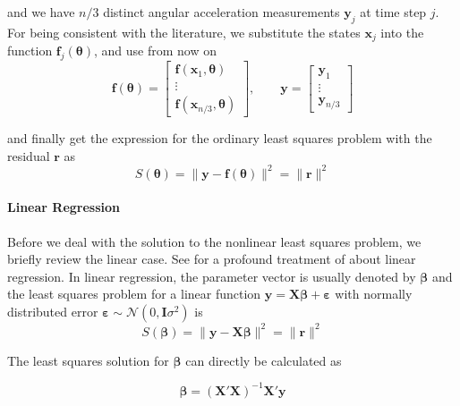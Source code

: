 and we have $n/3$ distinct angular acceleration measurements $\mathbf{y}_j$ at time step $j$.
For being consistent with the literature, we substitute the states $\mathbf{x}_j$ into the function $\mathbf{f}_j(\boldsymbol{\theta})$, and use from now on
\begin{equation}
\mathbf{f}(\boldsymbol{\theta}) = \left[ \begin{array}{c}
\mathbf{f}(\mathbf{x}_1, \boldsymbol{\theta}) \\
\vdots \\
\mathbf{f}(\mathbf{x}_{n/3}, \boldsymbol{\theta})
\end{array} \right]
, \qquad
\mathbf{y} = \left[ \begin{array}{c}
\mathbf{y}_1 \\
\vdots \\
\mathbf{y}_{n/3} 
\end{array} \right]
\end{equation}

and finally get the expression for the ordinary least squares problem with the residual $\mathbf{r}$ as
\begin{equation}
\label{eq:cost_ols}
S(\boldsymbol{\theta}) = \| \mathbf{y} - \mathbf{f}(\boldsymbol{\theta}) \|^2 = \| \mathbf{r} \|^2
\end{equation}

\paragraph{Linear Regression\\}
Before we deal with the solution to the nonlinear least squares problem, we briefly review the linear case. See \citet{Draper} for a profound treatment of about linear regression.
In linear regression, the parameter vector is usually denoted by $\boldsymbol{\beta}$ and the least squares problem for a linear function 
$\mathbf{y} = \mathbf{X} \boldsymbol{\beta} + \boldsymbol{\varepsilon}$ 
with normally distributed error 
$\boldsymbol{\varepsilon} \sim \mathcal{N}(0,\mathbf{I} \sigma^2)$ 
is
\begin{equation}
S(\boldsymbol{\beta}) = \| \mathbf{y} - \mathbf{X}\boldsymbol{\beta} \|^2 = \| \mathbf{r} \|^2
\end{equation}

The least squares solution for $\boldsymbol{\beta}$ can directly be calculated as

\begin{equation}
\label{eq:linear_ls_solution}
\boldsymbol{\beta} = (\mathbf{X}' \mathbf{X})^{-1} \mathbf{X}' \mathbf{y}
\end{equation}

